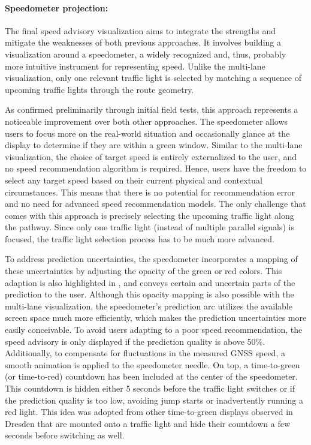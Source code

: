 \paragraph{Speedometer projection:} The final speed advisory visualization aims to integrate the strengths and mitigate the weaknesses of both previous approaches. It involves building a visualization around a speedometer, a widely recognized and, thus, probably more intuitive instrument for representing speed. Unlike the multi-lane visualization, only one relevant traffic light is selected by matching a sequence of upcoming traffic lights through the route geometry.

As confirmed preliminarily through initial field tests, this approach represents a noticeable improvement over both other approaches. The speedometer allows users to focus more on the real-world situation and occasionally glance at the display to determine if they are within a green window. Similar to the multi-lane visualization, the choice of target speed is entirely externalized to the user, and no speed recommendation algorithm is required. Hence, users have the freedom to select any target speed based on their current physical and contextual circumstances. This means that there is no potential for recommendation error and no need for advanced speed recommendation models. The only challenge that comes with this approach is precisely selecting the upcoming traffic light along the pathway. Since only one traffic light (instead of multiple parallel signals) is focused, the traffic light selection process has to be much more advanced.

To address prediction uncertainties, the speedometer incorporates a mapping of these uncertainties by adjusting the opacity of the green or red colors. This adaption is also highlighted in , and conveys certain and uncertain parts of the prediction to the user. Although this opacity mapping is also possible with the multi-lane visualization, the speedometer's prediction arc utilizes the available screen space much more efficiently, which makes the prediction uncertainties more easily conceivable. To avoid users adapting to a poor speed recommendation, the speed advisory is only displayed if the prediction quality is above 50\%. Additionally, to compensate for fluctuations in the measured GNSS speed, a smooth animation is applied to the speedometer needle. On top, a time-to-green (or time-to-red) countdown has been included at the center of the speedometer. This countdown is hidden either 5 seconds before the traffic light switches or if the prediction quality is too low, avoiding jump starts or inadvertently running a red light. This idea was adopted from other time-to-green displays observed in Dresden that are mounted onto a traffic light and hide their countdown a few seconds before switching as well.

